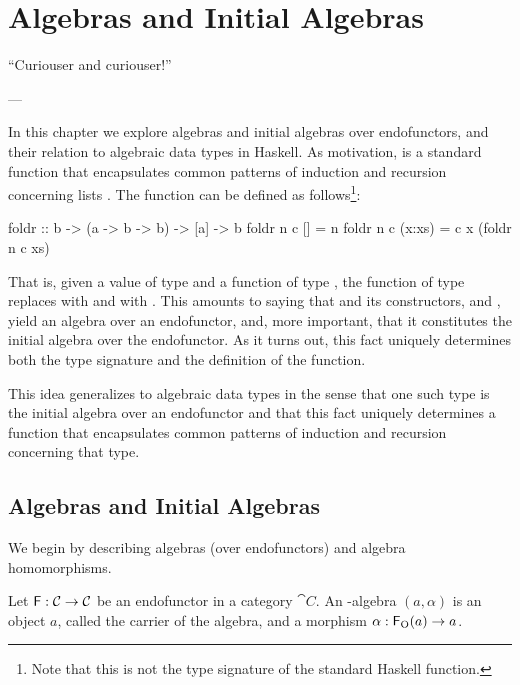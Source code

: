 \chapter{Algebras and Initial Algebras}
\label{chap:algebras}

\epigraph{
  ``Curiouser and curiouser!''
}{---\textcite[23]{carroll-2004}}

In this chapter we explore algebras and initial algebras over
endofunctors, and their relation to algebraic data types in Haskell.
As motivation,  is a standard function that
encapsulates common patterns of induction and recursion concerning
lists \parencite[355--356]{hutton-1999}. The 
function can be defined as follows\footnote{Note that this is not the
  type signature of the standard Haskell 
  function.}:
\begin{codehaskell}
foldr :: b -> (a -> b -> b) -> [a] -> b
foldr n c []     = n
foldr n c (x:xs) = c x (foldr n c xs)
\end{codehaskell}
That is, given a value  of type  and a
function  of type , the
function  of type 
replaces \texthaskell{[]} with  and \texthaskell{(:)}
with . This amounts to saying that \texthaskell{[a]}
and its constructors, \texthaskell{[]} and \texthaskell{(:)}, yield an
algebra over an endofunctor, and, more important, that it constitutes
the initial algebra over the endofunctor. As it turns out, this fact
uniquely determines both the type signature and the definition of the
 function.

This idea generalizes to algebraic data types in the sense that one
such type is the initial algebra over an endofunctor and that this
fact uniquely determines a function that encapsulates common patterns
of induction and recursion concerning that type.

\section{Algebras and Initial Algebras}
\label{sec:algebras}

We begin by describing algebras (over endofunctors) and algebra
homomorphisms.

\begin{definition}
  \label{def:algebra}


  Let $\mathsf{F}: \mathcal{C} \to \mathcal{C}$ be an endofunctor in a category
  $\cat{C}$. An -al\-ge\-bra $(a,\alpha)$ is an object $a$,
  called the carrier of the algebra, and a morphism $\alpha:
  \mathsf{F}_{\operatorname{O}}(a) \to a$.

\end{definition}

